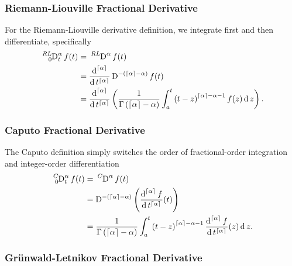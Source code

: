 \subsubsection{Riemann-Liouville Fractional Derivative}

For the Riemann-Liouville derivative definition, we integrate first and then differentiate, specifically 
\begin{equation}
  \begin{aligned}
  \tensor*[^{RL}_0]{\D}{^\alpha_t}  f(t) &= \tensor*[^{RL}]{\D}{^\alpha} f(t) \\
  &= \frac{\d^{\lc \alpha \rc}}{\d t^{\lc \alpha \rc}} \tensor*[]{\D}{^{-\left( \lc \alpha \rc - \alpha \right)}} f(t) \\ 
    &= 
    \frac{\d^{\lc \alpha \rc}}{\d t^{\lc \alpha \rc}} \left( \frac{1}{\Gamma\left(\lc \alpha \rc - \alpha \right)} \int_a^t \left( t - z \right)^{\lc \alpha \rc - \alpha - 1} f(z) \d z \right). 
  \end{aligned}
  \label{eq:rldef}
\end{equation}


\subsubsection{Caputo Fractional Derivative}
The Caputo definition simply switches the order of fractional-order integration and integer-order differentiation
\begin{equation}
  \begin{aligned}
  \tensor*[^{C}_0]{\D}{^\alpha_t}  f(t) &= \tensor*[^{C}]{\D}{^\alpha} f(t) \\
  &= \tensor*[]{\D}{^{-\left( \lc \alpha \rc - \alpha \right)}} \left( \frac{\d^{\lc \alpha \rc} f}{\d t^{\lc \alpha \rc}}(t) \right) \\ 
    &= 
    \frac{1}{\Gamma\left(\lc \alpha \rc - \alpha \right)} \int_a^t \left( t - z \right)^{\lc \alpha \rc - \alpha - 1}  \frac{\d^{\lc \alpha \rc}f}{\d t^{\lc \alpha \rc}} (z) \d z. 
  \end{aligned}
  \label{eq:caputodef}
\end{equation}




\subsubsection{Gr\"unwald-Letnikov Fractional Derivative}
